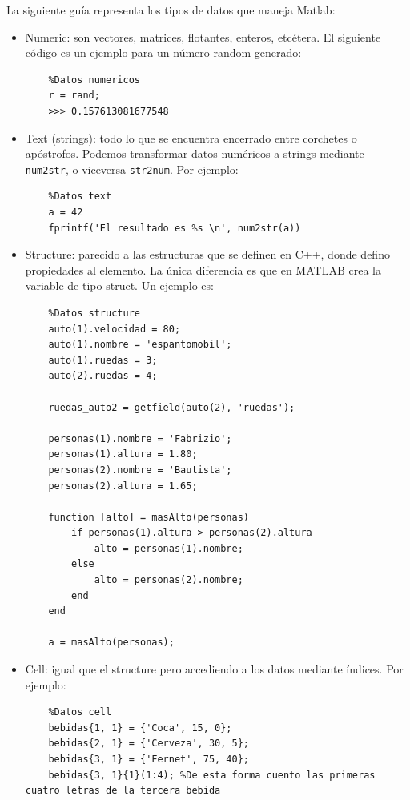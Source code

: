 La siguiente guía representa los tipos de datos que maneja Matlab:

\begin{itemize}
    \item Numeric: son vectores, matrices, flotantes, enteros, etcétera. El siguiente código es un ejemplo para un número random generado:
    
    \begin{lstlisting}
    %Datos numericos
    r = rand;
    >>> 0.157613081677548
    \end{lstlisting}

    \item Text (strings): todo lo que se encuentra encerrado entre corchetes o apóstrofos. Podemos transformar datos numéricos a strings mediante \texttt{num2str}, o viceversa \texttt{str2num}. Por ejemplo:
    
    \begin{lstlisting}
    %Datos text
    a = 42
    fprintf('El resultado es %s \n', num2str(a))
    \end{lstlisting}

    \item Structure: parecido a las estructuras que se definen en C++, donde defino propiedades al elemento. La única diferencia es que en MATLAB crea la variable de tipo struct. Un ejemplo es:
    
    \begin{lstlisting}
    %Datos structure
    auto(1).velocidad = 80;
    auto(1).nombre = 'espantomobil';
    auto(1).ruedas = 3;
    auto(2).ruedas = 4;

    ruedas_auto2 = getfield(auto(2), 'ruedas');

    personas(1).nombre = 'Fabrizio';
    personas(1).altura = 1.80;
    personas(2).nombre = 'Bautista';
    personas(2).altura = 1.65;

    function [alto] = masAlto(personas)
        if personas(1).altura > personas(2).altura
            alto = personas(1).nombre;
        else
            alto = personas(2).nombre;
        end
    end

    a = masAlto(personas);
    \end{lstlisting}

    \item Cell: igual que el structure pero accediendo a los datos mediante índices. Por ejemplo:

    \begin{lstlisting}
    %Datos cell
    bebidas{1, 1} = {'Coca', 15, 0};
    bebidas{2, 1} = {'Cerveza', 30, 5};
    bebidas{3, 1} = {'Fernet', 75, 40};
    bebidas{3, 1}{1}(1:4); %De esta forma cuento las primeras cuatro letras de la tercera bebida
    \end{lstlisting}


\end{itemize}
